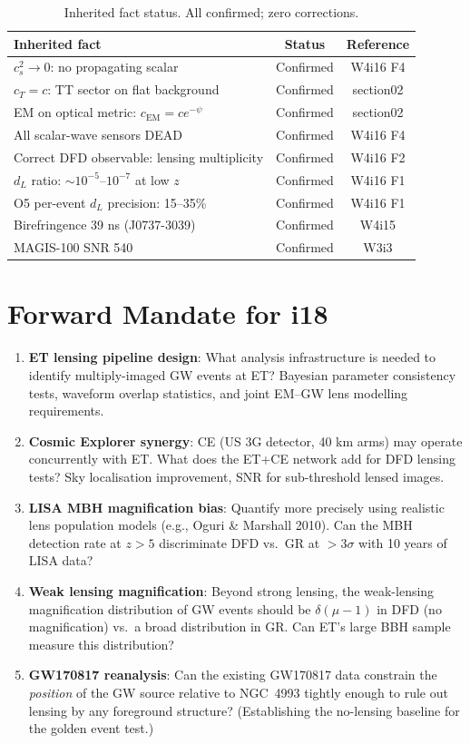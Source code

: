 \documentclass[11pt]{article}
\theoremstyle{definition}
\theoremstyle{remark}
\begin{document}
\begin{table}[H]
\centering
\small
\begin{tabular}{@{}lcc@{}}
\toprule
Inherited fact & Status & Reference \\
\midrule
$c_s^2 \to 0$: no propagating scalar & Confirmed & W4i16 F4 \\
$c_T = c$: TT sector on flat background & Confirmed & section02 \\
EM on optical metric: $c_{\mathrm{EM}} = c e^{-\psi}$ & Confirmed & section02 \\
All scalar-wave sensors DEAD & Confirmed & W4i16 F4 \\
Correct DFD observable: lensing multiplicity & Confirmed & W4i16 F2 \\
$d_L$ ratio: $\sim$$10^{-5}$--$10^{-7}$ at low $z$ & Confirmed & W4i16 F1 \\
O5 per-event $d_L$ precision: 15--35\% & Confirmed & W4i16 F1 \\
Birefringence 39 ns (J0737-3039) & Confirmed & W4i15 \\
MAGIS-100 SNR 540 & Confirmed & W3i3 \\
\bottomrule
\end{tabular}
\caption{Inherited fact status. All confirmed; zero corrections.}
\end{table}


\section*{Forward Mandate for i18}

\begin{enumerate}[nosep]
\item \textbf{ET lensing pipeline design}: What analysis infrastructure
  is needed to identify multiply-imaged GW events at ET? Bayesian
  parameter consistency tests, waveform overlap statistics, and joint
  EM--GW lens modelling requirements.
\item \textbf{Cosmic Explorer synergy}: CE (US 3G detector, 40 km arms)
  may operate concurrently with ET. What does the ET+CE network add
  for DFD lensing tests? Sky localisation improvement, SNR for
  sub-threshold lensed images.
\item \textbf{LISA MBH magnification bias}: Quantify more precisely
  using realistic lens population models (e.g., Oguri \& Marshall 2010).
  Can the MBH detection rate at $z > 5$ discriminate DFD vs.\ GR at
  $>3\sigma$ with 10 years of LISA data?
\item \textbf{Weak lensing magnification}: Beyond strong lensing, the
  weak-lensing magnification distribution of GW events should be
  $\delta(\mu - 1)$ in DFD (no magnification) vs.\ a broad distribution
  in GR. Can ET's large BBH sample measure this distribution?
\item \textbf{GW170817 reanalysis}: Can the existing GW170817 data
  constrain the \emph{position} of the GW source relative to NGC~4993
  tightly enough to rule out lensing by any foreground structure?
  (Establishing the no-lensing baseline for the golden event test.)
\end{enumerate}
\end{document}
